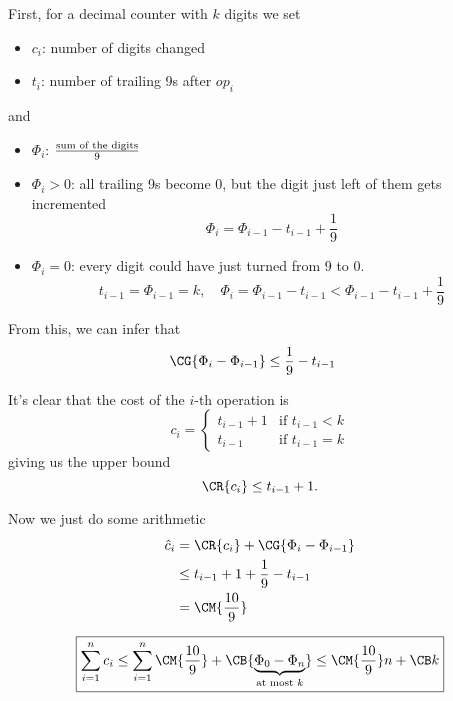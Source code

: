 First, for a decimal counter with \(k\) digits we set
\begin{itemize}
    \item \(c_i\): number of digits changed
    \item \(t_i\): number of trailing 9s after \(op_i\)
\end{itemize}
and
\begin{itemize}
    \item \(\Phi_i\): \(\text{sum of the digits}\over 9\)
    \item \(\Phi_i > 0\): all trailing 9s become 0, but the digit just left of them gets incremented
    \begin{displaymath}
        \Phi_i = \Phi_{i-1} - t_{i-1} + \frac{1}{9}
    \end{displaymath}
    \item \(\Phi_i = 0\): every digit could have just turned from 9 to 0.
    \begin{displaymath}
        t_{i-1} = \Phi_{i-1} = k, \quad \Phi_i = \Phi_{i-1} - t_{i-1} < \Phi_{i-1} - t_{i-1} + \frac{1}{9}
    \end{displaymath}
\end{itemize}

From this, we can infer that
\begin{displaymath}
    \begin{aligned}
        \CG{\Phi_i - \Phi_{i-1}}
        &\leq \frac{1}{9} - t_{i-1}
    \end{aligned}
\end{displaymath}

It's clear that the cost of the \(i\)-th operation is
\begin{displaymath}
    c_i = \begin{cases}
        t_{i - 1} + 1 & \text{if } t_{i - 1} < k \\
        t_{i - 1} & \text{if } t_{i - 1} = k
    \end{cases}
\end{displaymath}
giving us the upper bound
\begin{displaymath}
    \CR{c_i} \leq t_{i - 1} + 1.
\end{displaymath}

Now we just do some arithmetic
\begin{displaymath}
    \begin{aligned}
        \hat{c}_i
        &= \CR{c_{i}} + \CG{\Phi_i - \Phi_{i-1}} \\
        &\leq t_{i - 1} + 1 + \frac{1}{9} - t_{i-1} \\
        &= \CM{\frac{10}{9}}
    \end{aligned}
\end{displaymath}


\begin{displaymath}
    \boxed{
        \sum_{i = 1}^n c_i 
        \leq \sum_{i = 1}^n \CM{\frac{10}{9}} + \CB{\underbrace{\Phi_0 - \Phi_n}_{\text{at most }k}}
        \leq \CM{\frac{10}{9}}n + \CB k
    }
\end{displaymath}